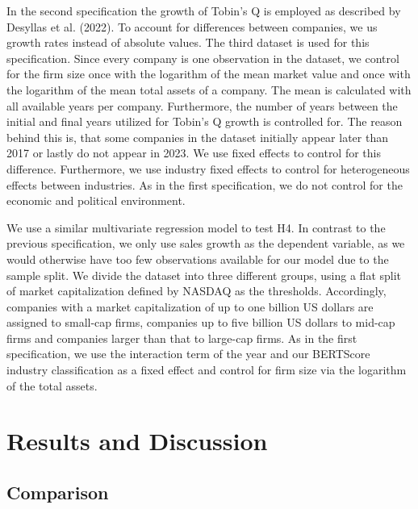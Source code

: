 \documentclass[
]{article}
\begin{document}
In the second specification the growth of Tobin's Q is employed as
described by Desyllas et al. (2022). To account for differences between
companies, we us growth rates instead of absolute values. The third
dataset is used for this specification. Since every company is one
observation in the dataset, we control for the firm size once with the
logarithm of the mean market value and once with the logarithm of the
mean total assets of a company. The mean is calculated with all
available years per company. Furthermore, the number of years between
the initial and final years utilized for Tobin's Q growth is controlled
for. The reason behind this is, that some companies in the dataset
initially appear later than 2017 or lastly do not appear in 2023. We use
fixed effects to control for this difference. Furthermore, we use
industry fixed effects to control for heterogeneous effects between
industries. As in the first specification, we do not control for the
economic and political environment.

We use a similar multivariate regression model to test H4. In contrast
to the previous specification, we only use sales growth as the dependent
variable, as we would otherwise have too few observations available for
our model due to the sample split. We divide the dataset into three
different groups, using a flat split of market capitalization defined by
NASDAQ as the thresholds. Accordingly, companies with a market
capitalization of up to one billion US dollars are assigned to small-cap
firms, companies up to five billion US dollars to mid-cap firms and
companies larger than that to large-cap firms. As in the first
specification, we use the interaction term of the year and our BERTScore
industry classification as a fixed effect and control for firm size via
the logarithm of the total assets.

\section{Results and Discussion}\label{results-and-discussion}

\subsection{Comparison}\label{comparison}
\end{document}
